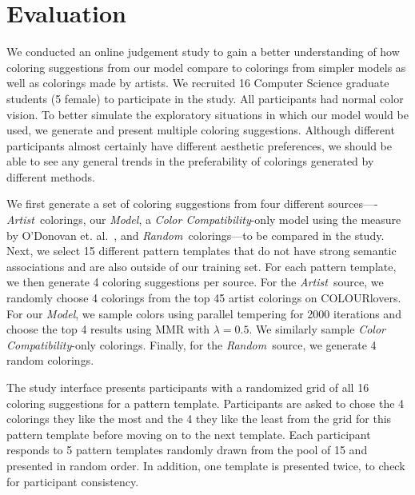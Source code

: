 \section{Evaluation}
\label{sec:evaluation}

We conducted an online judgement study to gain a better understanding of how coloring suggestions from our model compare to colorings from simpler models as well as colorings made by artists. We recruited 16 Computer Science graduate students (5 female) to participate in the study. All participants had normal color vision. To better simulate the exploratory situations in which our model would be used, we generate and present multiple coloring suggestions. Although different participants almost certainly have different aesthetic preferences, we should be able to see any general trends in the preferability of colorings generated by different methods. 

\newcommand{\artistSource}{\emph{Artist}}
\newcommand{\modelSource}{\emph{Model}}
\newcommand{\compatSource}{\emph{Color Compatibility}}
\newcommand{\randomSource}{\emph{Random}}
We first generate a set of coloring suggestions from four different sources----\artistSource~colorings, our \modelSource, a \compatSource-only model using the measure by O'Donovan et. al.~, and \randomSource~colorings---to be compared in the study. Next, we select 15 different pattern templates that do not have strong semantic associations and are also outside of our training set. For each pattern template, we then generate 4 coloring suggestions per source. For the \artistSource~source, we randomly choose 4 colorings from the top 45 artist colorings on COLOURlovers. For our \modelSource, we sample colors using parallel tempering for 2000 iterations and choose the top 4 results using MMR with $\lambda = 0.5$. We similarly sample \compatSource-only colorings. Finally, for the \randomSource~source, we generate 4 random colorings.

The study interface presents participants with a randomized grid of all 16 coloring suggestions for a pattern template. Participants are asked to chose the 4 colorings they like the most and the 4 they like the least from the grid for this pattern template before moving on to the next template. Each participant responds to 5 pattern templates randomly drawn from the pool of 15 and presented in random order. In addition, one template is presented twice, to check for participant consistency.

